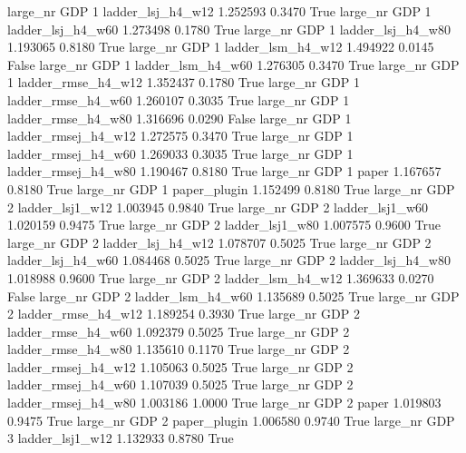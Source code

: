   large_nr      GDP                 1   ladder_lsj_h4_w12   1.252593      0.3470    True
  large_nr      GDP                 1   ladder_lsj_h4_w60   1.273498      0.1780    True
  large_nr      GDP                 1   ladder_lsj_h4_w80   1.193065      0.8180    True
  large_nr      GDP                 1   ladder_lsm_h4_w12   1.494922      0.0145   False
  large_nr      GDP                 1   ladder_lsm_h4_w60   1.276305      0.3470    True
  large_nr      GDP                 1  ladder_rmse_h4_w12   1.352437      0.1780    True
  large_nr      GDP                 1  ladder_rmse_h4_w60   1.260107      0.3035    True
  large_nr      GDP                 1  ladder_rmse_h4_w80   1.316696      0.0290   False
  large_nr      GDP                 1 ladder_rmsej_h4_w12   1.272575      0.3470    True
  large_nr      GDP                 1 ladder_rmsej_h4_w60   1.269033      0.3035    True
  large_nr      GDP                 1 ladder_rmsej_h4_w80   1.190467      0.8180    True
  large_nr      GDP                 1               paper   1.167657      0.8180    True
  large_nr      GDP                 1        paper_plugin   1.152499      0.8180    True
  large_nr      GDP                 2     ladder_lsj1_w12   1.003945      0.9840    True
  large_nr      GDP                 2     ladder_lsj1_w60   1.020159      0.9475    True
  large_nr      GDP                 2     ladder_lsj1_w80   1.007575      0.9600    True
  large_nr      GDP                 2   ladder_lsj_h4_w12   1.078707      0.5025    True
  large_nr      GDP                 2   ladder_lsj_h4_w60   1.084468      0.5025    True
  large_nr      GDP                 2   ladder_lsj_h4_w80   1.018988      0.9600    True
  large_nr      GDP                 2   ladder_lsm_h4_w12   1.369633      0.0270   False
  large_nr      GDP                 2   ladder_lsm_h4_w60   1.135689      0.5025    True
  large_nr      GDP                 2  ladder_rmse_h4_w12   1.189254      0.3930    True
  large_nr      GDP                 2  ladder_rmse_h4_w60   1.092379      0.5025    True
  large_nr      GDP                 2  ladder_rmse_h4_w80   1.135610      0.1170    True
  large_nr      GDP                 2 ladder_rmsej_h4_w12   1.105063      0.5025    True
  large_nr      GDP                 2 ladder_rmsej_h4_w60   1.107039      0.5025    True
  large_nr      GDP                 2 ladder_rmsej_h4_w80   1.003186      1.0000    True
  large_nr      GDP                 2               paper   1.019803      0.9475    True
  large_nr      GDP                 2        paper_plugin   1.006580      0.9740    True
  large_nr      GDP                 3     ladder_lsj1_w12   1.132933      0.8780    True
